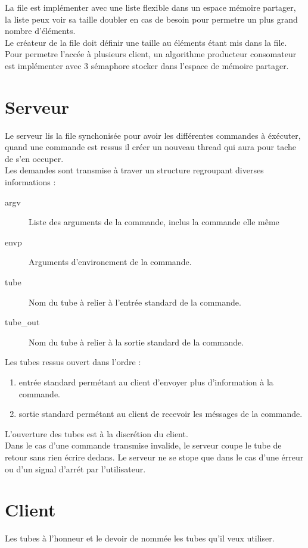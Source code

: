 \documentclass[12pt]{article}
\begin{document}
    La file est implémenter avec une liste flexible dans un espace mémoire partager, la liste peux voir sa taille doubler en cas de besoin pour permetre un plus grand nombre d'éléments. \\
    Le créateur de la file doit définir une taille au éléments étant mis dans la file.\\
    Pour permetre l'accée à plusieurs client, un algorithme producteur consomateur est implémenter avec 3 sémaphore stocker dans l'espace de mémoire partager.

\newpage
\section{Serveur}
    Le serveur lis la file synchonisée pour avoir les différentes commandes à éxécuter, quand une commande est ressus il créer un nouveau thread qui aura pour tache de s'en occuper.\\
    Les demandes sont transmise à traver un structure regroupant diverses informations :
    \begin{description}
        \item [argv] Liste des arguments de la commande, inclus la commande elle même
        \item [envp] Arguments d'environement de la commande.
        \item [tube\in] Nom du tube à relier à l'entrée standard de la commande.
        \item [tube\_out] Nom du tube à relier à la sortie standard de la commande.
    \end{description}
    Les tubes ressus ouvert dans l'ordre :
    \begin{enumerate}
        \item entrée standard permétant au client d'envoyer plus d'information à la commande.
        \item sortie standard permétant au client de recevoir les méssages de la commande.
    \end{enumerate}
    L'ouverture des tubes est à la discrétion du client.\\
    Dans le cas d'une commande transmise invalide, le serveur coupe le tube de retour sans rien écrire dedans.
    Le serveur ne se stope que dans le cas d'une érreur ou d'un signal d'arrét par l'utilisateur.
\newpage
\section{Client}
    Les tubes à l'honneur et le devoir de nommée les tubes qu'il veux utiliser.
\end{document}
